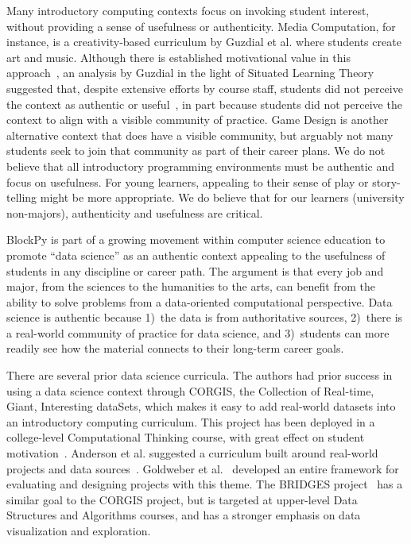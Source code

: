 \documentclass[10pt,journal,compsoc]{IEEEtran}
\begin{document}
Many introductory computing contexts focus on invoking student interest, without providing a sense of usefulness or authenticity.
Media Computation, for instance, is a creativity-based curriculum by Guzdial et al. where students create art and music.
Although there is established motivational value in this approach~\cite{guzdial2013exploring}, an analysis by Guzdial in the light of Situated Learning Theory suggested that, despite extensive efforts by course staff, students did not perceive the context as authentic or useful~\cite{guzdial2006imagineering}, in part because students did not perceive the context to align with a visible community of practice.
Game Design is another alternative context that does have a visible community, but arguably not many students seek to join that community as part of their career plans.
We do not believe that all introductory programming environments must be authentic and focus on usefulness.
For young learners, appealing to their sense of play or story-telling might be more appropriate.
We do believe that for our learners (university non-majors), authenticity and usefulness are critical.

BlockPy is part of a growing movement within computer science education to promote ``data science'' as an authentic context appealing to the usefulness of students in any discipline or career path.
The argument is that every job and major, from the sciences to the humanities to the arts, can benefit from the ability to solve problems from a data-oriented computational perspective.
Data science is authentic because 1)~the data is from authoritative sources, 2)~there is a real-world community of practice for data science, and 3)~students can more readily see how the material connects to their long-term career goals.

There are several prior data science curricula.
The authors had prior success in using a data science context through CORGIS, the Collection of Real-time, Giant, Interesting dataSets, which makes it easy to add real-world datasets into an introductory computing curriculum.
This project has been deployed in a college-level Computational Thinking course, with great effect on student motivation~\cite{kafura2015design,corgis2017}.
Anderson et al. suggested a curriculum built around real-world projects and data sources~\cite{Anderson}.
Goldweber et al.~\cite{goldweber2013framework} developed an entire framework for evaluating and designing projects with this theme.
The BRIDGES project~\cite{subramanian2016bringing} has a similar goal to the CORGIS project, but is targeted at upper-level Data Structures and Algorithms courses, and has a stronger emphasis on data visualization and exploration.
\end{document}
